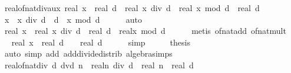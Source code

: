 \begin{isabellebody}
\ real{\isacharunderscore}{\kern0pt}of{\isacharunderscore}{\kern0pt}nat{\isacharunderscore}{\kern0pt}div{\isacharunderscore}{\kern0pt}aux{\isacharcolon}{\kern0pt}\ {\isachardoublequoteopen}real\ x\ {\isacharslash}{\kern0pt}\ real\ d\ {\isacharequal}{\kern0pt}\ real\ {\isacharparenleft}{\kern0pt}x\ div\ d{\isacharparenright}{\kern0pt}\ {\isacharplus}{\kern0pt}\ real\ {\isacharparenleft}{\kern0pt}x\ mod\ d{\isacharparenright}{\kern0pt}\ {\isacharslash}{\kern0pt}\ real\ d{\isachardoublequoteclose}\isanewline
%
\isadelimproof
%
\endisadelimproof
%
\isatagproof
{}\isamarkupfalse%
\ {\isacharminus}{\kern0pt}\isanewline
\ \ \isamarkupfalse%
\ {\isachardoublequoteopen}x\ {\isacharequal}{\kern0pt}\ {\isacharparenleft}{\kern0pt}x\ div\ d{\isacharparenright}{\kern0pt}\ {\isacharasterisk}{\kern0pt}\ d\ {\isacharplus}{\kern0pt}\ x\ mod\ d{\isachardoublequoteclose}\isanewline
\ \ \ \ \isamarkupfalse%
\ auto\isanewline
\ \ \isamarkupfalse%
\ \isamarkupfalse%
\ {\isachardoublequoteopen}real\ x\ {\isacharequal}{\kern0pt}\ real\ {\isacharparenleft}{\kern0pt}x\ div\ d{\isacharparenright}{\kern0pt}\ {\isacharasterisk}{\kern0pt}\ real\ d\ {\isacharplus}{\kern0pt}\ real{\isacharparenleft}{\kern0pt}x\ mod\ d{\isacharparenright}{\kern0pt}{\isachardoublequoteclose}\isanewline
\ \ \ \ \isamarkupfalse%
\ {\isacharparenleft}{\kern0pt}metis\ of{\isacharunderscore}{\kern0pt}nat{\isacharunderscore}{\kern0pt}add\ of{\isacharunderscore}{\kern0pt}nat{\isacharunderscore}{\kern0pt}mult{\isacharparenright}{\kern0pt}\isanewline
\ \ \isamarkupfalse%
\ \isamarkupfalse%
\ {\isachardoublequoteopen}real\ x\ {\isacharslash}{\kern0pt}\ real\ d\ {\isacharequal}{\kern0pt}\ {\isasymdots}\ {\isacharslash}{\kern0pt}\ real\ d{\isachardoublequoteclose}\isanewline
\ \ \ \ \isamarkupfalse%
\ simp\isanewline
\ \ \isamarkupfalse%
\ \isamarkupfalse%
\ {\isacharquery}{\kern0pt}thesis\isanewline
\ \ \ \ \isamarkupfalse%
\ {\isacharparenleft}{\kern0pt}auto\ simp\ add{\isacharcolon}{\kern0pt}\ add{\isacharunderscore}{\kern0pt}divide{\isacharunderscore}{\kern0pt}distrib\ algebra{\isacharunderscore}{\kern0pt}simps{\isacharparenright}{\kern0pt}\isanewline
{}\isamarkupfalse%
%
\endisatagproof
{\isafoldproof}%
%
\isadelimproof
\isanewline
%
\endisadelimproof
\isanewline
{}\isamarkupfalse%
\ real{\isacharunderscore}{\kern0pt}of{\isacharunderscore}{\kern0pt}nat{\isacharunderscore}{\kern0pt}div{\isacharcolon}{\kern0pt}\ {\isachardoublequoteopen}d\ dvd\ n\ {\isasymLongrightarrow}\ real{\isacharparenleft}{\kern0pt}n\ div\ d{\isacharparenright}{\kern0pt}\ {\isacharequal}{\kern0pt}\ real\ n\ {\isacharslash}{\kern0pt}\ real\ d{\isachardoublequoteclose}\isanewline

\end{isabellebody}
